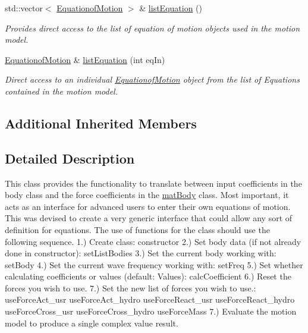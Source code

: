 \begin{DoxyCompactItemize}
std\-::vector$<$ \hyperlink{classosea_1_1ofreq_1_1_equationof_motion}{Equationof\-Motion} $>$ \& \hyperlink{classosea_1_1ofreq_1_1_motion_model_a608c356b5eb21fee5036a44124497815}{list\-Equation} ()
\begin{DoxyCompactList}\small\item\em Provides direct access to the list of equation of motion objects used in the motion model. \end{DoxyCompactList}\item 
\hyperlink{classosea_1_1ofreq_1_1_equationof_motion}{Equationof\-Motion} \& \hyperlink{classosea_1_1ofreq_1_1_motion_model_a444cd6e6ca1aea0822545b732118aeb9}{list\-Equation} (int eq\-In)
\begin{DoxyCompactList}\small\item\em Direct access to an individual \hyperlink{classosea_1_1ofreq_1_1_equationof_motion}{Equationof\-Motion} object from the list of Equations contained in the motion model. \end{DoxyCompactList}\end{DoxyCompactItemize}
\subsection*{Additional Inherited Members}


\subsection{Detailed Description}
This class provides the functionality to translate between input coefficients in the body class and the force coefficients in the \hyperlink{classosea_1_1ofreq_1_1mat_body}{mat\-Body} class. Most important, it acts as an interface for advanced users to enter their own equations of motion. This was devised to create a very generic interface that could allow any sort of definition for equations. The use of functions for the class should use the following sequence. 1.) Create class\-: constructor 2.) Set body data (if not already done in constructor)\-: set\-List\-Bodies 3.) Set the current body working with\-: set\-Body 4.) Set the current wave frequency working with\-: set\-Freq 5.) Set whether calculating coefficients or values (default\-: Values)\-: calc\-Coefficient 6.) Reset the forces you wish to use. 7.) Set the new list of forces you wish to use.\-: use\-Force\-Act\-\_\-usr use\-Force\-Act\-\_\-hydro use\-Force\-React\-\_\-usr use\-Force\-React\-\_\-hydro use\-Force\-Cross\-\_\-usr use\-Force\-Cross\-\_\-hydro use\-Force\-Mass 7.) Evaluate the motion model to produce a single complex value result. 

